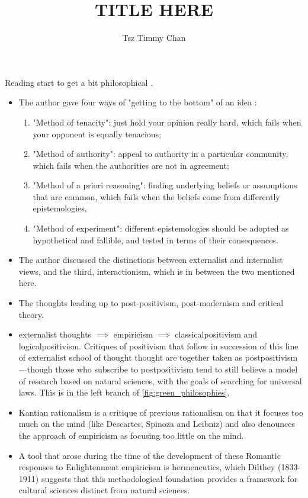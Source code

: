 \documentclass{TC}
\title{TITLE HERE}	%
\author{Tsz Timmy Chan}	%
\begin{document}
Reading start to get a bit philosophical \parencite{bredo_philosophies_2006}.
	\begin{itemize}
		\item The author gave four ways of "getting to the bottom" of an idea :
			\begin{enumerate}
			\item "Method of tenacity": just hold your opinion really hard, which fails when your opponent is equally tenacious;
			\item "Method of authority": appeal to authority in a particular community, which fails when the authorities are not in agreement;
			\item "Method of a priori reasoning": finding underlying beliefs or assumptions that are common, which fails when the beliefs come from differently epistemologies,
			\item "Method of experiment": different epistemologies should be adopted as hypothetical and fallible, and tested in terms of their consequences. 			\end{enumerate}
		\item The author discussed the distinctions between \gls{externalist} and \gls{internalist} views, and the third, \gls{interactionism}, which is in between the two mentioned here.
		\item The thoughts leading up to post-positivism, post-modernism and critical theory.
		\item \Gls{externalist} thoughts $\implies$ \gls{empiricism} $\implies$ \gls{classicalpositivism} and  \gls{logicalpositivism}. Critiques of positivism that follow in succession of this line of \gls{externalist} school of thought thought are together taken as \gls{postpositivism}---though those who subscribe to postpositivism tend to still believe a model of research based on natural sciences, with the goals of searching for universal laws. This is in the left branch of \autoref{fig:green_philosophies}.
		\item Kantian rationalism is a critique of previous \gls{rationalism} on that it focuses too much on the mind (like Descartes, Spinoza and Leibniz) and also denounces the approach of \gls{empiricism} as focusing too little on the mind. 
		\item A tool that arose during the time of the development of these Romantic responses to Enlightenment \gls{empiricism} is \gls{hermeneutics}, which Dilthey (1833-1911) suggests that this methodological foundation provides a framework for cultural sciences distinct from natural sciences.

\end{itemize}
\end{document}
